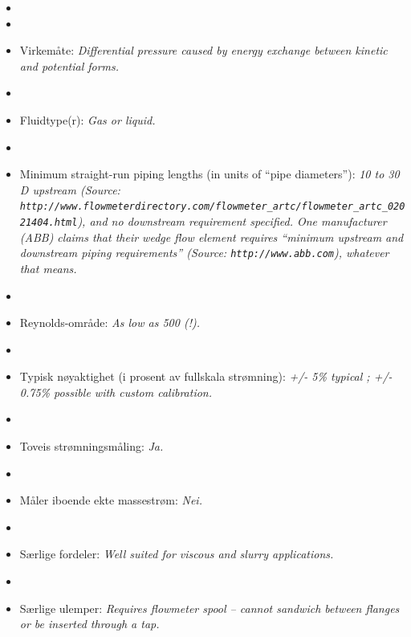 \begin{itemize}
\goodbreak
\item{} 
\vskip 5pt
\item\item{} Virkemåte: {\it Differential pressure caused by energy exchange between kinetic and potential forms.}
\vskip 5pt
\item\item{} Fluidtype(r): {\it Gas or liquid.}
\vskip 5pt
\item\item{} Minimum straight-run piping lengths (in units of ``pipe diameters''): {\it 10 to 30 D upstream (Source: {\tt http://www.flowmeterdirectory.com/flowmeter\_artc/flowmeter\_artc\_02021404.html}), and no downstream requirement specified.  One manufacturer (ABB) claims that their wedge flow element requires ``minimum upstream and downstream piping requirements'' (Source: {\tt http://www.abb.com}), whatever that means.}
\vskip 5pt
\item\item{} Reynolds-område: {\it As low as 500 (!).}
\vskip 5pt
\item\item{} Typisk nøyaktighet (i prosent av fullskala strømning): {\it +/- 5\% typical ; +/- 0.75\% possible with custom calibration.}
\vskip 5pt
\item\item{} Toveis strømningsmåling: {\it Ja.}
\vskip 5pt
\item\item{} Måler iboende ekte massestrøm: {\it Nei.}
\vskip 5pt
\item\item{} Særlige fordeler: {\it Well suited for viscous and slurry applications.}
\vskip 5pt
\item\item{} Særlige ulemper: {\it Requires flowmeter spool -- cannot sandwich between flanges or be inserted through a tap.}
\end{itemize}

